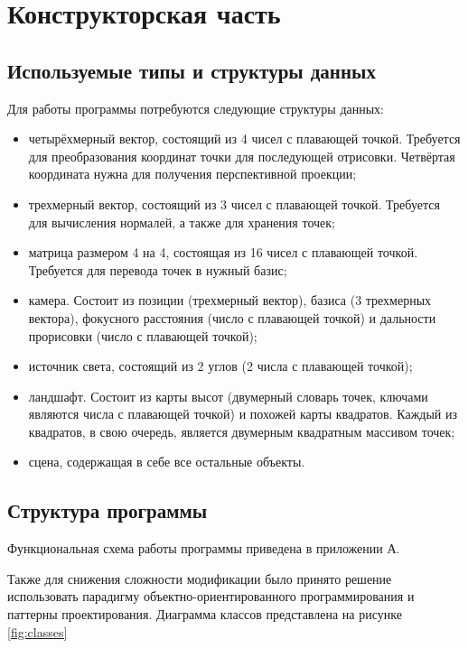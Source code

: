 \chapter{Конструкторская часть}

\section{Используемые типы и структуры данных}

Для работы программы потребуются следующие структуры данных:

\begin{itemize}
	\item четырёхмерный вектор, состоящий из 4 чисел с плавающей точкой. Требуется для преобразования координат точки для последующей отрисовки. Четвёртая координата нужна для получения перспективной проекции;
	\item трехмерный вектор, состоящий из 3 чисел с плавающей точкой. Требуется для вычисления нормалей, а также для хранения точек;
	\item матрица размером 4 на 4, состоящая из 16 чисел с плавающей точкой. Требуется для перевода точек в нужный базис;
	\item камера. Состоит из позиции (трехмерный вектор), базиса (3 трехмерных вектора), фокусного расстояния (число с плавающей точкой) и дальности прорисовки (число с плавающей точкой);
	\item источник света, состоящий из 2 углов (2 числа с плавающей точкой);
	\item ландшафт. Состоит из карты высот (двумерный словарь точек, ключами являются числа с плавающей точкой) и похожей карты квадратов. Каждый из квадратов, в свою очередь, является двумерным квадратным массивом точек;
	\item сцена, содержащая в себе все остальные объекты.
\end{itemize}

\section{Структура программы}

Функциональная схема работы программы приведена в приложении А.

Также для снижения сложности модификации было принято решение использовать парадигму объектно-ориентированного программирования и паттерны проектирования. Диаграмма классов представлена на рисунке \ref{fig:classes}

